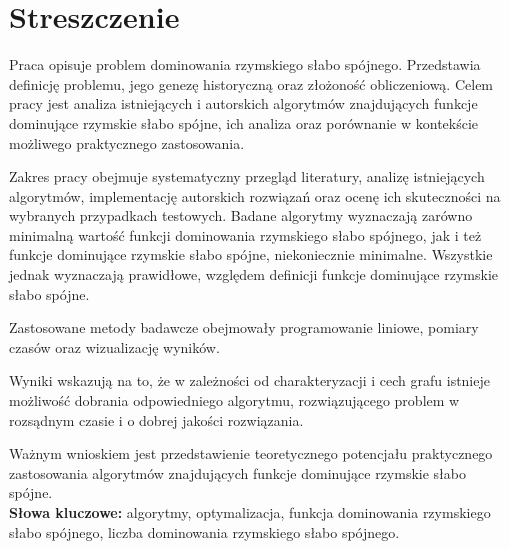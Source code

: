 \chapter*{Streszczenie}
Praca opisuje problem dominowania rzymskiego słabo spójnego. Przedstawia definicję problemu, jego genezę historyczną oraz złożoność obliczeniową. Celem pracy jest analiza istniejących i autorskich algorytmów znajdujących funkcje dominujące rzymskie słabo spójne, ich analiza oraz porównanie w kontekście możliwego praktycznego zastosowania.

Zakres pracy obejmuje systematyczny przegląd literatury, analizę istniejących algorytmów, implementację autorskich rozwiązań oraz ocenę ich skuteczności na wybranych przypadkach testowych. Badane algorytmy wyznaczają zarówno minimalną wartość funkcji dominowania rzymskiego słabo spójnego, jak i też funkcje dominujące rzymskie słabo spójne, niekoniecznie minimalne. Wszystkie jednak wyznaczają prawidłowe, względem definicji funkcje dominujące rzymskie słabo spójne.

Zastosowane metody badawcze obejmowały programowanie liniowe, pomiary czasów oraz wizualizację wyników.

Wyniki wskazują na to, że w zależności od charakteryzacji i cech grafu istnieje możliwość dobrania odpowiedniego algorytmu, rozwiązującego problem w rozsądnym czasie i o dobrej jakości rozwiązania.

Ważnym wnioskiem jest przedstawienie teoretycznego potencjału praktycznego zastosowania algorytmów znajdujących funkcje dominujące rzymskie słabo spójne.\\

\textbf{Słowa kluczowe:} algorytmy, optymalizacja, funkcja dominowania rzymskiego słabo spójnego, liczba dominowania rzymskiego słabo spójnego.

